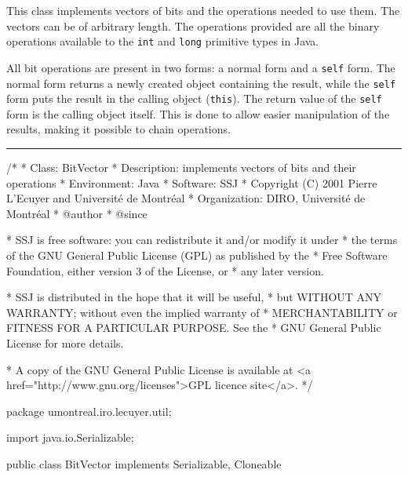 
This class implements vectors of bits and the operations needed to use
them. The vectors can be of arbitrary length. The operations provided are
all the binary operations available to the \texttt{int} and \texttt{long}
primitive types in Java.

All bit operations are present in two forms: a normal form and a \texttt{self}
form. The normal form returns a newly created object containing the result,
while the \texttt{self} form puts the result in the calling object (\texttt{this}).
The return value of the \texttt{self} form is the calling object itself. This is
done to allow easier manipulation of the results, making it possible to 
chain operations.

\bigskip\hrule
\begin{code}\begin{hide}
/*
 * Class:        BitVector
 * Description:  implements vectors of bits and their operations
 * Environment:  Java
 * Software:     SSJ 
 * Copyright (C) 2001  Pierre L'Ecuyer and Université de Montréal
 * Organization: DIRO, Université de Montréal
 * @author       
 * @since

 * SSJ is free software: you can redistribute it and/or modify it under
 * the terms of the GNU General Public License (GPL) as published by the
 * Free Software Foundation, either version 3 of the License, or
 * any later version.

 * SSJ is distributed in the hope that it will be useful,
 * but WITHOUT ANY WARRANTY; without even the implied warranty of
 * MERCHANTABILITY or FITNESS FOR A PARTICULAR PURPOSE.  See the
 * GNU General Public License for more details.

 * A copy of the GNU General Public License is available at
   <a href="http://www.gnu.org/licenses">GPL licence site</a>.
 */
\end{hide}
package umontreal.iro.lecuyer.util; \begin{hide}

import java.io.Serializable;
\end{hide}


public class BitVector implements Serializable, Cloneable \begin{hide} {

   static final long serialVersionUID = -3448233092524725148L;

   private int[] v;       //the bits data
   private int length;    //number of data bits (in bits, not in bytes)

   private final static int all_1 = -1;  //integer with all bits set to 1
   private final static int one_1 = 1;   //integer with only his last bit set to 1
   /*
     Note sur le format interne du vecteur de bits :
     On fait toujours en sorte que les bits redondants (ceux qui apparaissent
     quand length %
     operations entre des vecteurs de longeurs differentes en posant que
     les bits manquants sur le plus petit des deux vecteurs ont la valeur 0.
   */
 \end{hide}
\end{code}
 
